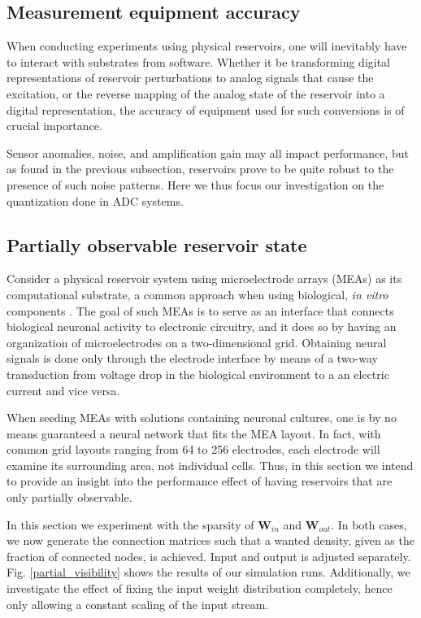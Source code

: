 \subsection{Measurement equipment accuracy}

When conducting experiments using physical reservoirs, one will inevitably have
to interact with substrates from software. Whether it be transforming digital
representations of reservoir perturbations to analog signals that cause the
excitation, or the reverse mapping of the analog state of the reservoir into a
digital representation, the accuracy of equipment used for such conversions is
of crucial importance.

Sensor anomalies, noise, and amplification gain may all impact performance, but
as found in the previous subsection, reservoirs prove to be quite robust to the
presence of such noise patterns. Here we thus focus our investigation on the
quantization done in ADC systems.

\subsection{Partially observable reservoir state}

Consider a physical reservoir system using microelectrode arrays (MEAs) as its
computational substrate, a common approach when using biological, \textit{in
vitro} components \cite{aaser_towards_2017}. The goal of such MEAs is to serve
as an interface that connects biological neuronal activity to electronic
circuitry, and it does so by having an organization of microelectrodes on a
two-dimensional grid. Obtaining neural signals is done only through the
electrode interface by means of a two-way transduction from voltage drop in the
biological environment to a an electric current and vice versa.

When seeding MEAs with solutions containing neuronal cultures, one is by no
means guaranteed a neural network that fits the MEA layout. In fact, with common
grid layouts ranging from 64 to 256 electrodes, each electrode will examine its
surrounding area, not individual cells. Thus, in this section we intend to
provide an insight into the performance effect of having reservoirs that are
only partially observable.

In this section we experiment with the sparsity of $\mathbf{W}_{in}$ and
$\mathbf{W}_{out}$. In both cases, we now generate the connection matrices such
that a wanted density, given as the fraction of connected nodes, is
achieved. Input and output is adjusted separately. Fig. \ref{partial_visibility}
shows the results of our simulation runs. Additionally, we investigate the
effect of fixing the input weight distribution completely, hence only allowing a
constant scaling of the input stream.

